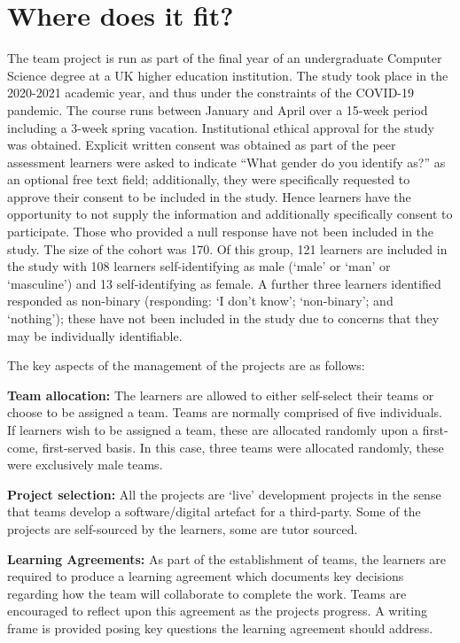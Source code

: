 \documentclass[sigconf, anonymous=false]{acmart}
\begin{document}
\section{Where does it fit?}
The team project is run as part of the final year of an undergraduate
Computer Science degree at a UK higher education institution. The
study took place in the 2020-2021 academic year, and thus under the
constraints of the COVID-19 pandemic. The course runs between January
and April over a 15-week period including a 3-week spring
vacation. Institutional ethical approval for the study was
obtained. Explicit written consent was obtained as part of the peer
assessment learners were asked to indicate ``What gender do you
identify as?'' as an optional free text field; additionally, they were
specifically requested to approve their consent to be included in the
study. Hence learners have the opportunity to not supply the
information and additionally specifically consent to
participate. Those who provided a null response have not been included
in the study. The size of the cohort was 170. Of this group, 121
learners are included in the study with 108 learners self-identifying
as male (`male' or `man' or `masculine') and 13 self-identifying as
female. A further three learners identified responded as non-binary
(responding: `I don't know'; `non-binary'; and `nothing'); these have
not been included in the study due to concerns that they may be
individually identifiable.

The key aspects of the management of the projects are as
follows:

    \textbf{Team allocation:}
The learners are allowed to either self-select their teams or choose
to be assigned a team. Teams are normally comprised of five
individuals. If learners wish to be assigned a team, these are
allocated randomly upon a first-come, first-served basis. In this case, three teams were allocated randomly, these were exclusively male teams.

\textbf {Project selection:}
All the projects are `live' development projects in the sense that
teams develop a software/digital artefact for a third-party. Some of the
projects are self-sourced by the learners, some are tutor sourced.

\textbf{Learning Agreements:}
As part of the establishment of teams, the learners are required to
produce a learning agreement which documents key decisions regarding
how the team will collaborate to complete the work. Teams are
encouraged to reflect upon this agreement as the projects progress. A
writing frame is provided posing key questions the learning agreement
should address.
\end{document}
